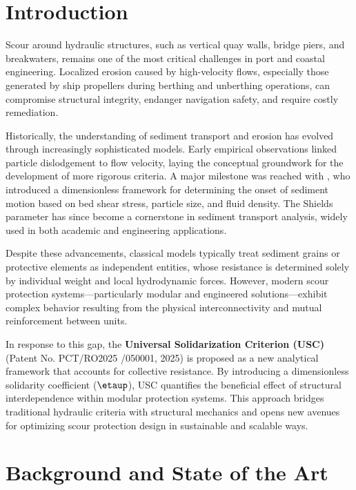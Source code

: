 \documentclass[Journal,letterpaper]{ascelike-new}
\begin{document}
\section{Introduction}

Scour around hydraulic structures, such as vertical quay walls, bridge piers, and breakwaters, remains one of the most critical challenges in port and coastal engineering. Localized erosion caused by high-velocity flows, especially those generated by ship propellers during berthing and unberthing operations, can compromise structural integrity, endanger navigation safety, and require costly remediation.



Historically, the understanding of sediment transport and erosion has evolved through increasingly sophisticated models. Early empirical observations linked particle dislodgement to flow velocity, laying the conceptual groundwork for the development of more rigorous criteria. A major milestone was reached with \cite{shields1936}, who introduced a dimensionless framework for determining the onset of sediment motion based on bed shear stress, particle size, and fluid density. The Shields parameter has since become a cornerstone in sediment transport analysis, widely used in both academic and engineering applications.

Despite these advancements, classical models typically treat sediment grains or protective elements as independent entities, whose resistance is determined solely by individual weight and local hydrodynamic forces. However, modern scour protection systems---particularly modular and engineered solutions---exhibit complex behavior resulting from the physical interconnectivity and mutual reinforcement between units.

In response to this gap, the \textbf{Universal Solidarization Criterion (USC)} (Patent No. PCT/RO2025 /050001, 2025) is proposed as a new analytical framework that accounts for collective resistance. By introducing a dimensionless solidarity coefficient ($\etaup$), USC quantifies the beneficial effect of structural interdependence within modular protection systems. This approach bridges traditional hydraulic criteria with structural mechanics and opens new avenues for optimizing scour protection design in sustainable and scalable ways.


\section{Background and State of the Art}
\end{document}
